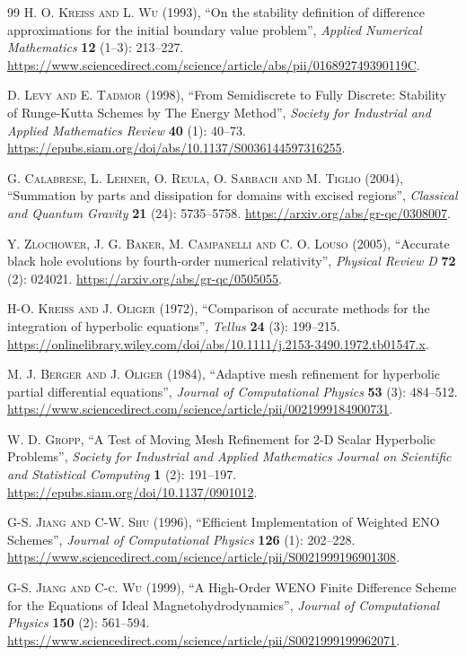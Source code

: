 \documentclass{article}
\begin{document}
\begin{thebibliography}{99}
\textsc{H. O. Kreiss and L. Wu} (1993), ``On the stability definition of difference approximations for the initial boundary value problem'', \textit{Applied Numerical Mathematics} \textbf{12} (1--3): 213--227. \url{https://www.sciencedirect.com/science/article/abs/pii/016892749390119C}.

\textsc{D. Levy and E. Tadmor} (1998), ``From Semidiscrete to Fully Discrete: Stability of Runge-Kutta Schemes by The Energy Method'', \textit{Society for Industrial and Applied Mathematics Review} \textbf{40} (1): 40--73. \url{https://epubs.siam.org/doi/abs/10.1137/S0036144597316255}.

\textsc{G. Calabrese, L. Lehner, O. Reula, O. Sarbach and M. Tiglio} (2004), ``Summation by parts and dissipation for domains with excised regions'', \textit{Classical and Quantum Gravity} \textbf{21} (24): 5735--5758. \url{https://arxiv.org/abs/gr-qc/0308007}.

\textsc{Y. Zlochower, J. G. Baker, M. Campanelli and C. O. Louso} (2005), ``Accurate black hole evolutions by fourth-order numerical relativity'', \textit{Physical Review D} \textbf{72} (2): 024021. \url{https://arxiv.org/abs/gr-qc/0505055}.

\textsc{H-O. Kreiss and J. Oliger} (1972), ``Comparison of accurate methods for the integration of hyperbolic equations'', \textit{Tellus} \textbf{24} (3): 199--215. \url{https://onlinelibrary.wiley.com/doi/abs/10.1111/j.2153-3490.1972.tb01547.x}.

\textsc{M. J. Berger and J. Oliger} (1984), ``Adaptive mesh refinement for hyperbolic partial differential equations'', \textit{Journal of Computational Physics} \textbf{53} (3): 484--512. \url{https://www.sciencedirect.com/science/article/pii/0021999184900731}.

\textsc{W. D. Gropp}, ``A Test of Moving Mesh Refinement for 2-D Scalar Hyperbolic Problems'', \textit{Society for Industrial and Applied Mathematics Journal on Scientific and Statistical Computing} \textbf{1} (2): 191--197. \url{https://epubs.siam.org/doi/10.1137/0901012}.

\textsc{G-S. Jiang and C-W. Shu} (1996), ``Efficient Implementation of Weighted ENO Schemes'', \textit{Journal of Computational Physics} \textbf{126} (1): 202--228. \url{https://www.sciencedirect.com/science/article/pii/S0021999196901308}.

\textsc{G-S. Jiang and C-c. Wu} (1999), ``A High-Order WENO Finite Difference Scheme for the Equations of Ideal Magnetohydrodynamics'', \textit{Journal of Computational Physics} \textbf{150} (2): 561--594. \url{https://www.sciencedirect.com/science/article/pii/S0021999199962071}.


\end{thebibliography}
\end{document}

